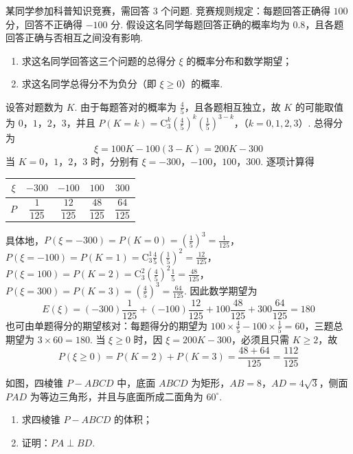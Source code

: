 \begin{problem}
某同学参加科普知识竞赛，需回答 \(3\) 个问题. 竞赛规则规定：每题回答正确得 \(100\) 分，回答不正确得 \(-100\) 分. 假设这名同学每题回答正确的概率均为 \(0.8\)，且各题回答正确与否相互之间没有影响.

\begin{enumerate}
\item 求这名同学回答这三个问题的总得分 \(\xi\) 的概率分布和数学期望；
\item 求这名同学总得分不为负分（即 \(\xi \geqslant 0\)）的概率.
\end{enumerate}
\end{problem}

\begin{solution}
设答对题数为 \(K\). 由于每题答对的概率为 \(\frac45\)，且各题相互独立，故 \(K\) 的可能取值为 \(0\)，\(1\)，\(2\)，\(3\)，并且
\(P(K=k)=\mathrm C_{3}^{k}\left(\frac45\right)^k\left(\frac15\right)^{3-k}\)，（\(k=0,1,2,3\)）.
总得分为
\[
\xi=100K-100(3-K)=200K-300
\]
当 \(K=0\)，\(1\)，\(2\)，\(3\) 时，分别有 \(\xi=-300\)，\(-100\)，\(100\)，\(300\). 逐项计算得
\begin{center}
\begin{tabular}{c|cccc}
\(\xi\) & \(-300\) & \(-100\) & \(100\) & \(300\) \\ \hline
\(P\) & \(\dfrac1{125}\) & \(\dfrac{12}{125}\) & \(\dfrac{48}{125}\) & \(\dfrac{64}{125}\)
\end{tabular}
\end{center}
具体地，\(P(\xi=-300)=P(K=0)=\left(\frac15\right)^3=\frac1{125}\)，\(P(\xi=-100)=P(K=1)=\mathrm C_3^1\frac45\left(\frac15\right)^2=\frac{12}{125}\)，\(P(\xi=100)=P(K=2)=\mathrm C_3^2\left(\frac45\right)^2\frac15=\frac{48}{125}\)，\(P(\xi=300)=P(K=3)=\left(\frac45\right)^3=\frac{64}{125}\). 因此数学期望为
\[
E(\xi)=(-300)\frac1{125}+(-100)\frac{12}{125}+100\frac{48}{125}+300\frac{64}{125}=180
\]
也可由单题得分的期望核对：每题得分的期望为 \(100\times\frac45-100\times\frac15=60\)，三题总期望为 \(3\times60=180\). 当 \(\xi\geqslant0\) 时，因 \(\xi=200K-300\)，必须且只需 \(K\geqslant2\)，故
\[
P(\xi\geqslant0)=P(K=2)+P(K=3)=\frac{48+64}{125}=\frac{112}{125}
\]
\end{solution}

\begin{problem}
如图，四棱锥 \(P - ABCD\) 中，底面 \(ABCD\) 为矩形，\(AB = 8\)，\(AD = 4\sqrt{3}\)，侧面 \(PAD\) 为等边三角形，并且与底面所成二面角为 \(60^{\circ}\).

\begin{enumerate}
\item 求四棱锥 \(P - ABCD\) 的体积；
\item 证明：\(PA \perp BD\).
\end{enumerate}

\begin{center}
\end{center}
\end{problem}

